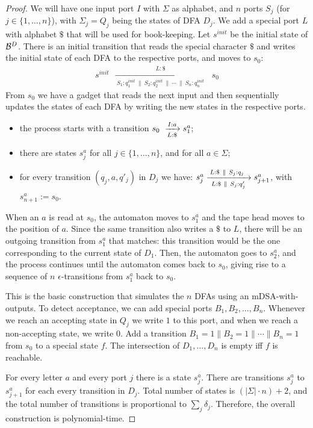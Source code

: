 \begin{proof}
    We will have one input port $I$ with $\Sigma$ as alphabet, and $n$ ports $S_j$ (for $j \in \{1, \dots, n\}$), with $\Sigma_j = Q_j$ being the states of DFA $D_j$. We add a special port $L$ with alphabet $\$$ that will be used for book-keeping. Let $s^{init}$ be the initial state of $\mathcal{B}^D$. There is an initial transition that reads the special character $\$$ and writes the initial state of each DFA to the respective ports, and moves to $s_0$:
    \begin{align*}
    s^{init}~~ \xrightarrow[~S_1: q^{init}_1 ~\parallel~ S_2: q^{init}_2 ~\parallel~ \cdots ~\parallel~ S_n: q^{init}_n~]{L: \$} ~~s_0
    \end{align*}
    From $s_0$ we have a gadget that reads the next input and then sequentially updates the states of each DFA by writing the new states in the respective ports. 
    \begin{itemize}
        \item the process starts with a transition $s_0~\xrightarrow[L:\$]{I:a} s^a_1$; 
        \item there are states $s^a_{j}$ for all $j \in \{1, \dots, n\}$, and for all $a \in \Sigma$;
        \item for every transition $(q_j, a, q'_j)$ in $D_j$ we have: $s^a_j \xrightarrow[~L:\$~\parallel~S_j: q'_j~]{L:\$ ~\parallel~ S_j: q_j~} s^a_{j+1}$, with $s^a_{n+1} := s_0$.
    \end{itemize}
    When an $a$ is read at $s_0$, the automaton moves to $s^a_1$ and the tape head moves to the position of $a$. Since the same transition also writes a $\$$ to $L$, there will be an outgoing transition from $s^a_1$ that matches: this transition would be the one corresponding to the current state of $D_1$. Then, the automaton goes to $s^a_2$, and the process continues until the automaton comes back to $s_0$, giving rise to a sequence of $n$ $\epsilon$-transitions from $s^a_1$ back to $s_0$. 

    This is the basic construction that simulates the $n$ DFAs using an mDSA-with-outputs. To detect acceptance, we can add special ports $B_1, B_2, \dots, B_n$. Whenever we reach an accepting state in $Q_j$ we write $1$ to this port, and when we reach a non-accepting state, we write $0$. Add a transition $B_1 = 1 \parallel B_2 = 1 \parallel \cdots \parallel B_n = 1$ from $s_0$ to a special state $f$. The intersection of $D_1, \dots, D_n$ is empty iff $f$ is reachable.

    For every letter $a$ and every port $j$ there is a state $s^a_j$. There are transitions $s^a_j$ to $s^a_{j+1}$ for each every transition in $D_j$. Total number of states is $(|\Sigma| \cdot n) + 2$, and the total number of transitions is proportional to $\sum_j \delta_j$.  Therefore, the overall construction is polynomial-time.


\end{proof}







